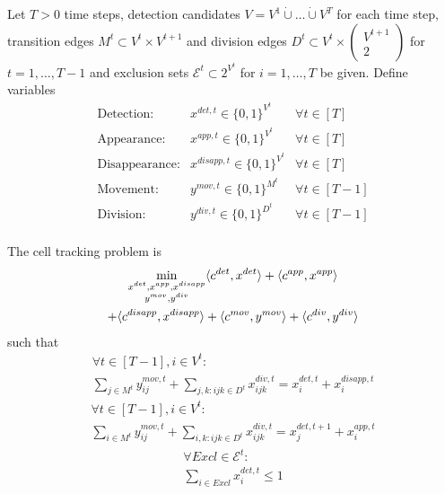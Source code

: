 \begin{definition}
Let 
$T > 0$ time steps, 
detection candidates $V = V^1 \dot{\cup} \ldots \dot{\cup} V^T$ for each time step,
transition edges $M^t \subset V^t \times V^{t+1}$ and 
division edges $D^t \subset V^t \times \begin{pmatrix}V^{t+1} \\ 2 \end{pmatrix}$ for $t=1,\ldots,T-1$ and 
exclusion sets $\mathcal{E}^t \subset 2^{V^t}$ for $i=1,\ldots,T$
be given.
Define variables
\begin{equation}
\begin{array}{lrl}
    \text{Detection:} &
    x^{det,t} \in \{0,1\}^{V^t} & \forall t \in [T] \\
    \text{Appearance:} &
    x^{app,t} \in \{0,1\}^{V^t} & \forall t \in [T] \\
    \text{Disappearance:} &
    x^{disapp,t} \in \{0,1\}^{V^t} & \forall t \in [T] \\
    \text{Movement:} &
    y^{mov,t} \in \{0,1\}^{M^t} & \forall t \in [T-1] \\
    \text{Division:} &
    y^{div,t} \in \{0,1\}^{D^t} & \forall t \in [T-1] \\
   \end{array}
\end{equation}

The cell tracking problem is
\begin{multline}
\label{eq:cell-tracking-objective}
    \min_{\substack{x^{det}, x^{app}, x^{disapp}\\ y^{mov}, y^{div}}}  
    \langle c^{det}, x^{det} \rangle 
    + \langle c^{app}, x^{app} \rangle \\
    + \langle c^{disapp}, x^{disapp} \rangle 
    + \langle c^{mov}, y^{mov} \rangle 
    + \langle c^{div}, y^{div} \rangle 
\end{multline}
such that
    \begin{multline}
        \label{eq:cell-tracking-flow-conservation-incoming}
\forall t \in [T-1], i \in V^t: \\
        \sum_{j \in M^{t}} y^{mov,t}_{ij} + \sum_{j,k: ijk \in D^{t}} x^{div,t}_{ijk} = x^{det,t}_i + x^{disapp,t}_i 
    \end{multline}
    \begin{multline}
        \label{eq:cell-tracking-flow-conservation-outgoing}
\forall t \in [T-1], i \in V^t: \\
    \sum_{i \in M^{t}} y^{mov,t}_{ij} + \sum_{i,k: ijk \in D^{t}} x^{div,t}_{ijk} = x^{det,{t+1}}_j + x^{app,t}_i 
    \end{multline}
    \begin{multline}
        \label{eq:cell-tracking-exclusion-constraint}
        \forall Excl \in \mathcal{E}^t:\\
    \sum_{i \in Excl} x^{det,t}_i \leq 1 
\end{multline}
\end{definition}
